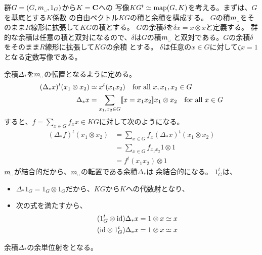 	群$G=(G,m_\myspace,1_G)$から$K={\mathbf{C}}$への
	写像$KG^t\simeq \operatorname{map}(G,K)$を考える。まずは、$G$を基底とする$K$係数
	の自由ベクトル$KG$の積と余積を構成する。
	$G$の積$m_\myspace$をそのまま$R$線形に拡張して$KG$の積とする。
	$G$の余積$\delta$を$\delta x=x\otimes x$と定義する。
	群的な余積は任意の積と双対になるので、$\delta$は$G$の積$m_\myspace$
	と双対である。$G$の余積$\delta$をそのまま$R$線形に拡張して$KG$の余積
	とする。
	$\delta$は任意の$x\in G$に対して$\zeta x=1$となる定数写像である。

	余積$\Delta_*$を$m_\myspace$の転置となるように定める。
	\begin{equation*}\begin{split} %
		(\Delta_*x)^t(x_1\otimes x_2) &\simeq x^t(x_1x_2)
			\quad\text{for all }x,x_1,x_2\in G \\
		\Delta_*x &= \sum_{x_1,x_2\in G}\jump{x=x_1x_2}x_1\otimes x_2
			\quad\text{for all }x\in G \\
	\end{split}\end{equation*} %
	すると、$f=\sum_{x\in G}f_xx\in KG$に対して次のようになる。
	\begin{equation*}\begin{split} %
		(\Delta_*f)^t(x_1\otimes x_2) 
		&= \sum_{x\in G}f_x(\Delta_*x)^t(x_1\otimes x_2) \\
		&= \sum_{x\in G}f_{x_1x_2}1\otimes 1 \\
		&= f^t(x_1x_2)\otimes 1
	\end{split}\end{equation*} %
	$m_\myspace$が結合的だから、$m_\myspace$の転置である余積$\Delta_*$は
	余結合的になる。
	$1_G^t$は、
	\begin{itemize}\setlength{\itemsep}{-1mm} %
		\item $\Delta_*1_G=1_G\otimes1_G$だから、$KG$から$K$への代数射となり、
		\item 次の式を満たすから、
			\begin{equation*}\begin{split} %
				(1_G^t\otimes \myid)\Delta_*x = 1\otimes x \simeq x \\
				(\myid\otimes 1_G^t)\Delta_*x = 1\otimes x \simeq x \\
			\end{split}\end{equation*} %
	\end{itemize} %
	余積$\Delta_*$の余単位射をとなる。

